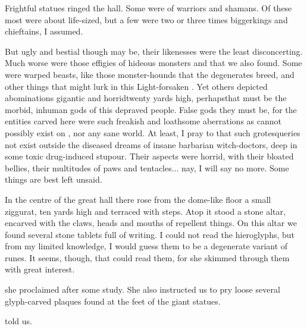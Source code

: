 \begin{diary}
Frightful statues ringed the hall. 
Some were of \meccaran{} warriors and shamans. 
Of these most were about life-sized, but a few were two or three times bigger\dash kings and chieftains, I assumed. 

But ugly and bestial though \meccara{} may be, their likenesses were the least disconcerting. 
Much worse were those effigies of hideous monsters and \daemons{} that we also found. 
Some were warped beasts, like those monster-hounds that the degenerates breed, and other things that might lurk in this Light-forsaken \Wylde{}. 
Yet others depicted abominations gigantic and horrid\dash twenty yards high, perhaps\dash that must be the morbid, inhuman gods of this depraved people. 
False gods they must be, for the entities carved here were such freakish and loathsome aberrations as 
cannot possibly exist on \Miith{}, nor any sane world.
At least, I pray to \Iquin{} that such grotesqueries not exist outside the diseased dreams of insane barbarian witch-doctors, deep in some toxic drug-induced stupour. 
Their aspects were horrid, with their bloated bellies, their multitudes of paws and tentacles... nay, I will say no more. 
Some things are best left unsaid. 

In the centre of the great hall there rose from the dome-like floor a small ziggurat, ten yards high and terraced with steps. 
Atop it stood a stone altar, encarved with the claws, heads and mouths of repellent things. 
On this altar we found several stone tablets full of writing. 
I could not read the hieroglyphs, but from my limited knowledge, I would guess them to be a degenerate variant of \Draconic{} runes. 
It seems, though, that \Miss{} \Takestsha{} could read them, for she skimmed through them with great interest. 

 she proclaimed after some study. 
She also instructed us to pry loose several glyph-carved plaques found at the feet of the giant statues. 

 \Takestsha{} told us. 


\end{diary}
